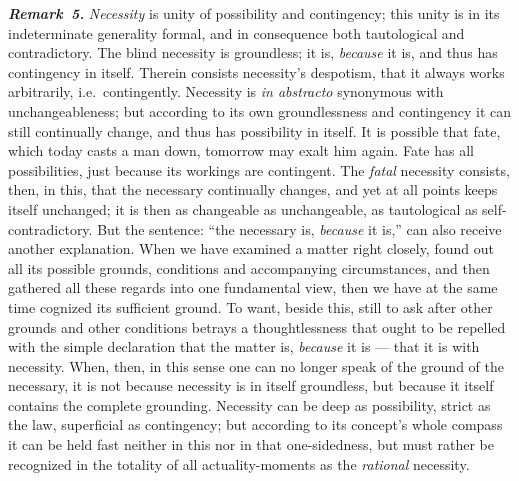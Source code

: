 \documentclass[12pt]{book}
\newcommand{\anm}[1]{\emph{\textbf{Remark~#1.}}}
\begin{document}
\anm{5} \emph{Necessity} is unity of possibility and contingency; this
unity is in its indeterminate generality formal, and in consequence both
tautological and contradictory. The blind necessity is groundless; it is,
\emph{because} it is, and thus has contingency in itself. Therein consists
necessity's despotism, that it always works arbitrarily, i.e.\
contingently. Necessity is \textit{in abstracto} synonymous with
unchangeableness; but according to its own groundlessness and contingency it
can still continually change, and thus has possibility in itself. It is
possible that fate, which today casts a man down, tomorrow may exalt him
again. Fate has all possibilities, just because its workings are contingent.
The \emph{fatal} necessity consists, then, in this, that the necessary
continually changes, and yet at all points keeps itself unchanged; it is
then as changeable as unchangeable, as tautological as self-contradictory.
But the sentence: ``the necessary is, \emph{because} it is,'' can also
receive another explanation. When we have examined a matter right closely,
found out all its possible grounds, conditions and accompanying
circumstances, and then gathered all these regards into one fundamental
view, then we have at the same time cognized its sufficient ground. To want,
beside this, still to ask after other grounds and other conditions betrays a
thoughtlessness that ought to be repelled with the simple declaration that
the matter is, \emph{because} it is --- that it is with necessity. When,
then, in this sense one can no longer speak of the ground of the necessary,
it is not because necessity is in itself groundless, but because it itself
contains the complete grounding. Necessity can be deep as possibility,
strict as the law, superficial as contingency; but according to its
concept's whole compass it can be held fast neither in this nor in that
one-sidedness, but must rather be recognized in the totality of all
actuality-moments as the \emph{rational} necessity.
\end{document}
